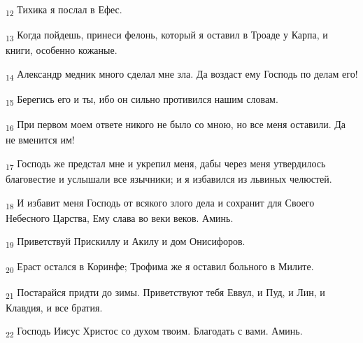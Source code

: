 \begin{tcolorbox}
\textsubscript{12} Тихика я послал в Ефес.
\end{tcolorbox}
\begin{tcolorbox}
\textsubscript{13} Когда пойдешь, принеси фелонь, который я оставил в Троаде у Карпа, и книги, особенно кожаные.
\end{tcolorbox}
\begin{tcolorbox}
\textsubscript{14} Александр медник много сделал мне зла. Да воздаст ему Господь по делам его!
\end{tcolorbox}
\begin{tcolorbox}
\textsubscript{15} Берегись его и ты, ибо он сильно противился нашим словам.
\end{tcolorbox}
\begin{tcolorbox}
\textsubscript{16} При первом моем ответе никого не было со мною, но все меня оставили. Да не вменится им!
\end{tcolorbox}
\begin{tcolorbox}
\textsubscript{17} Господь же предстал мне и укрепил меня, дабы через меня утвердилось благовестие и услышали все язычники; и я избавился из львиных челюстей.
\end{tcolorbox}
\begin{tcolorbox}
\textsubscript{18} И избавит меня Господь от всякого злого дела и сохранит для Своего Небесного Царства, Ему слава во веки веков. Аминь.
\end{tcolorbox}
\begin{tcolorbox}
\textsubscript{19} Приветствуй Прискиллу и Акилу и дом Онисифоров.
\end{tcolorbox}
\begin{tcolorbox}
\textsubscript{20} Ераст остался в Коринфе; Трофима же я оставил больного в Милите.
\end{tcolorbox}
\begin{tcolorbox}
\textsubscript{21} Постарайся придти до зимы. Приветствуют тебя Еввул, и Пуд, и Лин, и Клавдия, и все братия.
\end{tcolorbox}
\begin{tcolorbox}
\textsubscript{22} Господь Иисус Христос со духом твоим. Благодать с вами. Аминь.
\end{tcolorbox}
